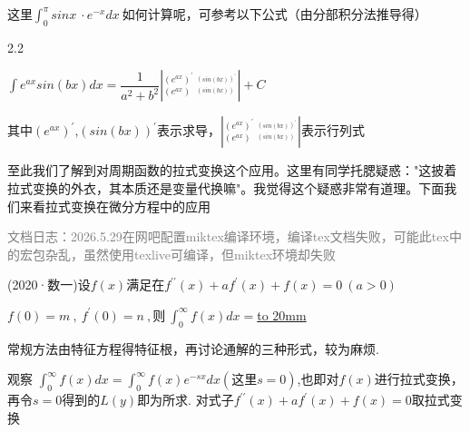 \documentclass[12pt]{report}
\begin{document}
  这里$\int_{0}^{\pi}sinx\:\cdot e^{-x}dx\:$如何计算呢，可参考以下公式（由分部积分法推导得）
  
  \vspace{-7pt}
  
  \begin{spacing}{2.2}
  	 \begin{center}
  		$\int e^{ax}sin\left(bx\right)dx=\dfrac{1}{a^{2}+b^{2}}\left|_{\left(e^{ax}\right)}^{\left(e^{ax}\right)^{\prime}}\:_{^{\left(sin\left(bx\right)\right)}}^{^{\left(sin\left(bx\right)\right)^{\prime}}}\right|+C$ 
  		
  		其中$\left(e^{ax}\right)^{\prime}$,$\left(sin\left(bx\right)\right)^{\prime}$表示求导，$\left|_{\left(e^{ax}\right)}^{\left(e^{ax}\right)^{\prime}}\:_{^{\left(sin\left(bx\right)\right)}}^{^{\left(sin\left(bx\right)\right)^{\prime}}}\right|$表示行列式
  	\end{center}
  \end{spacing}
 
  至此我们了解到对周期函数的拉式变换这个应用。这里有同学托腮疑惑："这披着拉式变换的外衣，其本质还是变量代换嘛"。我觉得这个疑惑非常有道理。下面我们来看拉式变换在微分方程中的应用
  
  \textcolor{gray}{文档日志：2026.5.29在网吧配置miktex编译环境，编译tex文档失败，可能此tex中的宏包杂乱，虽然使用texlive可编译，但miktex环境却失败}
  
  \clearpage
  
   (2020·数一)设$f(x)$满足在$f^{\prime\prime}\left(x\right)+af^{\prime}\left(x\right)+f\left(x\right)=0\:\left(a>0\right)$
  
  \hspace{3em}$f\left(0\right)=m\:,\:f^{\prime}\left(0\right)=n\:,则\:\int_{0}^{\infty}f\left(x\right)dx=$\underline{\hbox to 20mm{}}
   
   \vspace{10pt}
   
    常规方法由特征方程得特征根，再讨论通解的三种形式，较为麻烦.
   
   观察 $\int_{0}^{\infty}f\left(x\right)dx=\int_{0}^{\infty}f\left(x\right)e^{-sx}dx (这里s=0)$,也即对$f(x)$进行拉式变换，再令$s=0$得到的$L(y)$即为所求. 对式子$f^{\prime\prime}\left(x\right)+af^{\prime}\left(x\right)+f\left(x\right)=0$取拉式变换
   
   \vspace{-10pt}
   
\end{document}
